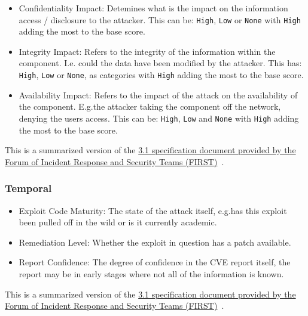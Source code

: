 \documentclass[12pt]{article}
\begin{document}
\begin{itemize}
	\item Confidentiality Impact: Detemines what is the impact on the information access /
	      disclosure to the attacker. This can be: \texttt{High}, \texttt{Low} or \texttt{None} with
	      \texttt{High} adding the most to the base score.

	\item Integrity Impact: Refers to the integrity of the information within the component. I.e.\@
	      could the data have been modified by the attacker. This has: \texttt{High}, \texttt{Low} or
	      \texttt{None}, as categories with \texttt{High} adding the most to the base score.

	\item Availability Impact: Refers to the impact of the attack on the availability of the
	      component. E.g.\@ the attacker taking the component off the network, denying the users
	      access. This can be: \texttt{High}, \texttt{Low} and \texttt{None} with \texttt{High} adding
	      the most to the base score.

\end{itemize}

{\footnotesize This is a summarized version of the
\href{https://www.first.org/cvss/v3.1/specification-document}{3.1 specification document
	provided by the  Forum of Incident Response and Security Teams (FIRST)}~\cite{CVSS_31}. } \\

\subsubsection*{Temporal}

\begin{itemize}

	\item Exploit Code Maturity: The state of the attack itself, e.g.\@ has this exploit been pulled
	      off in the wild or is it currently academic.

	\item Remediation Level: Whether the exploit in question has a patch available.

	\item Report Confidence: The degree of confidence in the CVE report itself, the report may be in
	      early stages where not all of the information is known.

\end{itemize}

{\footnotesize This is a summarized version of the
\href{https://www.first.org/cvss/v3.1/specification-document}{3.1 specification document
	provided by the Forum of Incident Response and Security Teams (FIRST)}~\cite{CVSS_31}.}  \\
\bigskip
\end{document}
